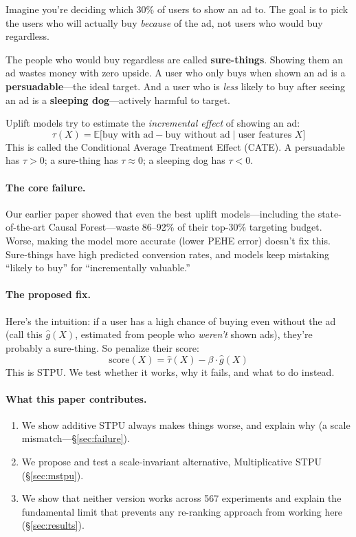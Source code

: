 \documentclass[10pt]{article}
\newcommand{\EE}{\mathbb{E}}
\newcommand{\ghat}{\hat{g}(X)}
\newcommand{\tauhat}{\hat{\tau}(X)}
\begin{document}
Imagine you're deciding which 30\% of users to show an ad to.
The goal is to pick the users who will actually buy \emph{because} of the ad,
not users who would buy regardless.

The people who would buy regardless are called \textbf{sure-things}.
Showing them an ad wastes money with zero upside.
A user who only buys when shown an ad is a \textbf{persuadable}---the ideal target.
And a user who is \emph{less} likely to buy after seeing an ad is a
\textbf{sleeping dog}---actively harmful to target.

Uplift models try to estimate the \emph{incremental effect} of showing an ad:
\begin{equation}
  \tau(X) = \EE\bigl[\text{buy with ad} - \text{buy without ad} \;\big|\; \text{user features } X\bigr]
\end{equation}
This is called the Conditional Average Treatment Effect (CATE).
A persuadable has $\tau > 0$; a sure-thing has $\tau \approx 0$;
a sleeping dog has $\tau < 0$.

\paragraph{The core failure.}
Our earlier paper \citep{clark2025benchmarking} showed that even the best
uplift models---including the state-of-the-art Causal Forest---waste 86--92\%
of their top-30\% targeting budget.  Worse, making the model more accurate
(lower PEHE error) doesn't fix this.  Sure-things have high predicted
conversion rates, and models keep mistaking ``likely to buy'' for
``incrementally valuable.''

\paragraph{The proposed fix.}
Here's the intuition: if a user has a high chance of buying even without the ad
(call this $\hat{g}(X)$, estimated from people who \emph{weren't} shown ads),
they're probably a sure-thing.  So penalize their score:
\begin{equation}
  \text{score}(X) = \tauhat - \beta \cdot \ghat
\end{equation}
This is STPU. We test whether it works, why it fails, and what to do instead.

\paragraph{What this paper contributes.}
\begin{enumerate}[topsep=2pt,itemsep=1pt]
  \item We show additive STPU always makes things worse, and explain why
    (a scale mismatch---\S\ref{sec:failure}).
  \item We propose and test a scale-invariant alternative, Multiplicative STPU
    (\S\ref{sec:mstpu}).
  \item We show that neither version works across 567 experiments and explain
    the fundamental limit that prevents any re-ranking approach from working here
    (\S\ref{sec:results}).
\end{enumerate}
\end{document}
